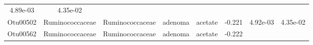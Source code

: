 \documentclass[11pt,]{article}
\begin{document}
\begin{longtable}[]{@{}cccccccc@{}}
\begin{minipage}[t]{0.08\columnwidth}
4.89e-03\strut
\end{minipage} & \begin{minipage}[t]{0.08\columnwidth}\centering\strut
4.35e-02\strut
\end{minipage}\tabularnewline
\begin{minipage}[t]{0.08\columnwidth}\centering\strut
Otu00502\strut
\end{minipage} & \begin{minipage}[t]{0.15\columnwidth}\centering\strut
Ruminococcaceae\strut
\end{minipage} & \begin{minipage}[t]{0.15\columnwidth}\centering\strut
Ruminococcaceae\strut
\end{minipage} & \begin{minipage}[t]{0.08\columnwidth}\centering\strut
adenoma\strut
\end{minipage} & \begin{minipage}[t]{0.09\columnwidth}\centering\strut
acetate\strut
\end{minipage} & \begin{minipage}[t]{0.07\columnwidth}\centering\strut
-0.221\strut
\end{minipage} & \begin{minipage}[t]{0.08\columnwidth}\centering\strut
4.92e-03\strut
\end{minipage} & \begin{minipage}[t]{0.08\columnwidth}\centering\strut
4.35e-02\strut
\end{minipage}\tabularnewline
\begin{minipage}[t]{0.08\columnwidth}\centering\strut
Otu00562\strut
\end{minipage} & \begin{minipage}[t]{0.15\columnwidth}\centering\strut
Ruminococcaceae\strut
\end{minipage} & \begin{minipage}[t]{0.15\columnwidth}\centering\strut
Ruminococcaceae\strut
\end{minipage} & \begin{minipage}[t]{0.08\columnwidth}\centering\strut
adenoma\strut
\end{minipage} & \begin{minipage}[t]{0.09\columnwidth}\centering\strut
acetate\strut
\end{minipage} & \begin{minipage}[t]{0.07\columnwidth}\centering\strut
-0.222\strut
\end{minipage} & \begin{minipage}[t]{0.08\columnwidth}\centering\strut

\end{minipage}
\end{longtable}
\end{document}
